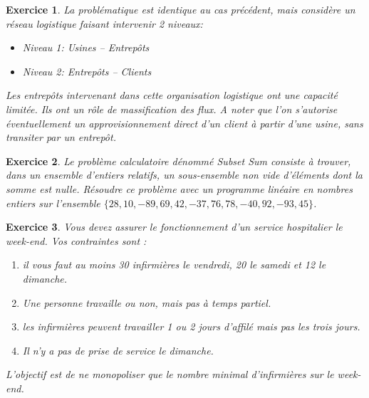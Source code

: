 \documentclass[french]{beamer}
\newtheorem{exercice}{Exercice}
\begin{document}
\begin{frame}
  \begin{exercice}
    La problématique  est identique au  cas précédent, mais considère  un réseau
    logistique faisant intervenir 2 niveaux:
    \begin{itemize}
    \item Niveau 1: Usines – Entrepôts
    \item Niveau 2: Entrepôts – Clients
    \end{itemize}
\pause
Les entrepôts  intervenant dans cette  organisation logistique ont  une capacité
limitée. Ils ont un rôle de massification  des flux. A noter que l’on s’autorise
éventuellement un  approvisionnement direct  d’un client  à partir  d’une usine,
sans transiter par un entrepôt.  
  \end{exercice}
\end{frame}



\begin{frame}
  \begin{exercice}
    Le problème calculatoire dénommé \emph{Subset  Sum} consiste à trouver, dans
    un ensemble d'entiers relatifs, un sous-ensemble non vide d'éléments dont la
    somme est nulle. Résoudre ce problème  avec un programme linéaire en nombres
    entiers sur l'ensemble  $\{28, 10, -89, 69,  42, -37, 76, 78,  -40, 92, -93,
    45\}$. 
  \end{exercice}
\end{frame}





\begin{frame}
  \begin{exercice}
    Vous devez assurer le fonctionnement d'un service hospitalier le week-end. Vos contraintes sont :			\begin{enumerate}
\item  il vous faut au moins 30 infirmières le vendredi, 20 le samedi et 12 le dimanche.
\item  Une personne travaille ou non, mais pas à temps partiel.		
\item  les infirmières peuvent travailler 1 ou 2 jours d'affilé mais pas les trois jours.
\item  Il n'y a pas de prise de service le dimanche.
\end{enumerate}

\pause


L’objectif est de ne monopoliser que le nombre minimal d’infirmières sur le week-end.
  \end{exercice}
\end{frame}
\end{document}
